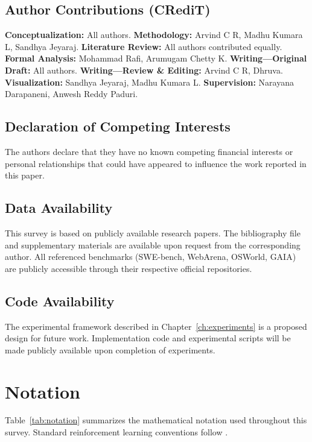\documentclass[12pt,a4paper]{report}
\theoremstyle{definition}
\begin{document}
\section*{Author Contributions (CRediT)}
\noindent\textbf{Conceptualization:} All authors. \textbf{Methodology:} Arvind C R, Madhu Kumara L, Sandhya Jeyaraj. \textbf{Literature Review:} All authors contributed equally. \textbf{Formal Analysis:} Mohammad Rafi, Arumugam Chetty K. \textbf{Writing---Original Draft:} All authors. \textbf{Writing---Review \& Editing:} Arvind C R, Dhruva. \textbf{Visualization:} Sandhya Jeyaraj, Madhu Kumara L. \textbf{Supervision:} Narayana Darapaneni, Anwesh Reddy Paduri.

\section*{Declaration of Competing Interests}
The authors declare that they have no known competing financial interests or personal relationships that could have appeared to influence the work reported in this paper.

\section*{Data Availability}
This survey is based on publicly available research papers. The bibliography file and supplementary materials are available upon request from the corresponding author. All referenced benchmarks (SWE-bench, WebArena, OSWorld, GAIA) are publicly accessible through their respective official repositories.

\section*{Code Availability}
The experimental framework described in Chapter~\ref{ch:experiments} is a proposed design for future work. Implementation code and experimental scripts will be made publicly available upon completion of experiments.

\appendix



\chapter*{Notation}
\label{ch:notation}

\noindent Table~\ref{tab:notation} summarizes the mathematical notation used throughout this survey. Standard reinforcement learning conventions follow \cite{sutton2018reinforcement}.
\end{document}
